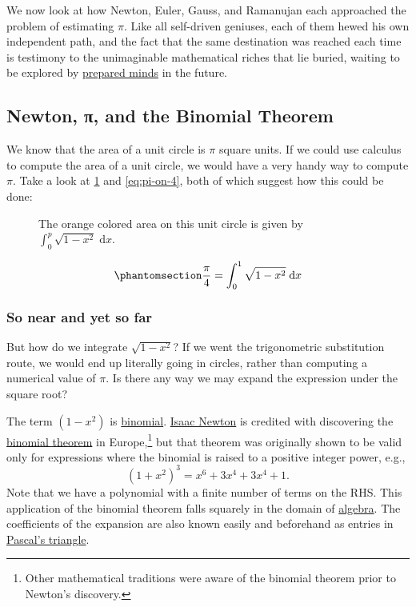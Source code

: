 \documentclass[
  a4paper,
]{article}
\begin{document}
We now look at how Newton, Euler, Gauss, and Ramanujan each approached
the problem of estimating \(\pi\). Like all self-driven geniuses, each
of them hewed his own independent path, and the fact that the same
destination was reached each time is testimony to the unimaginable
mathematical riches that lie buried, waiting to be explored by
\href{https://www.pasteurbrewing.com/louis-pasteur-chance-favors-the-prepared-mind/}{prepared
minds} in the future.

\subsection{Newton, π, and the Binomial
Theorem}\label{newton-ux3c0-and-the-binomial-theorem}

We know that the area of a unit circle is \(\pi\) square units. If we
could use calculus to compute the area of a unit circle, we would have a
very handy way to compute \(\pi\). Take a look at \cref{fig:quadrant}
and \cref{eq:pi-on-4}, both of which suggest how this could be done:

\begin{figure}
\centering

\caption{The orange colored area on this unit circle is given by
\(\displaystyle\int_0^p\sqrt{1-x^2}\;\mathrm{d}x\).}\label{fig:quadrant}
\end{figure}

\begin{equation}\phantomsection\label{eq:pi-on-4}{
\frac{\pi}{4} = \displaystyle\int_0^1\sqrt{1-x^2}\;\mathrm{d}x
}\end{equation}

\subsubsection{So near and yet so far}\label{so-near-and-yet-so-far}

But how do we integrate \(\sqrt{1-x^2}\)? If we went the trigonometric
substitution route, we would end up literally going in circles, rather
than computing a numerical value of \(\pi\). Is there any way we may
expand the expression under the square root?

The term \({(1 - x^2)}\) is
\href{https://www.google.com/search?q=binomial}{binomial}.
\href{https://en.wikipedia.org/wiki/Isaac_Newton}{Isaac Newton} is
credited with discovering the
\href{https://www.mathsisfun.com/algebra/binomial-theorem.html}{binomial
theorem} in Europe,\footnote{Other mathematical traditions were aware of
  the binomial theorem prior to Newton's discovery.} but that theorem
was originally shown to be valid only for expressions where the binomial
is raised to a positive integer power, e.g., \[
(1 + x^2)^3 = x^6 + 3x^4 + 3x^4 +1.
\] Note that we have a polynomial with a finite number of terms on the
RHS. This application of the binomial theorem falls squarely in the
domain of \href{https://www.britannica.com/science/algebra}{algebra}.
The coefficients of the expansion are also known easily and beforehand
as entries in
\href{https://www.britannica.com/science/Pascals-triangle}{Pascal's
triangle}.
\end{document}
